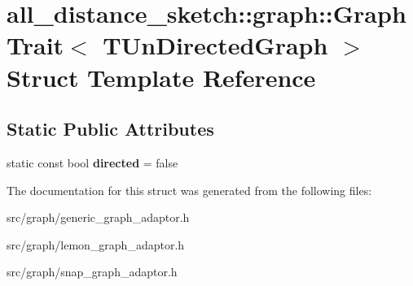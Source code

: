 \hypertarget{structall__distance__sketch_1_1graph_1_1GraphTrait_3_01TUnDirectedGraph_01_4}{}\section{all\+\_\+distance\+\_\+sketch\+:\+:graph\+:\+:Graph\+Trait$<$ T\+Un\+Directed\+Graph $>$ Struct Template Reference}
\label{structall__distance__sketch_1_1graph_1_1GraphTrait_3_01TUnDirectedGraph_01_4}
\subsection*{Static Public Attributes}
\begin{DoxyCompactItemize}
\item 
\hypertarget{structall__distance__sketch_1_1graph_1_1GraphTrait_3_01TUnDirectedGraph_01_4_a9c2b118886cfc92414d0666366ca9be9}{}static const bool {\bfseries directed} = false\label{structall__distance__sketch_1_1graph_1_1GraphTrait_3_01TUnDirectedGraph_01_4_a9c2b118886cfc92414d0666366ca9be9}

\end{DoxyCompactItemize}


The documentation for this struct was generated from the following files\+:\begin{DoxyCompactItemize}
\item 
src/graph/generic\+\_\+graph\+\_\+adaptor.\+h\item 
src/graph/lemon\+\_\+graph\+\_\+adaptor.\+h\item 
src/graph/snap\+\_\+graph\+\_\+adaptor.\+h\end{DoxyCompactItemize}
